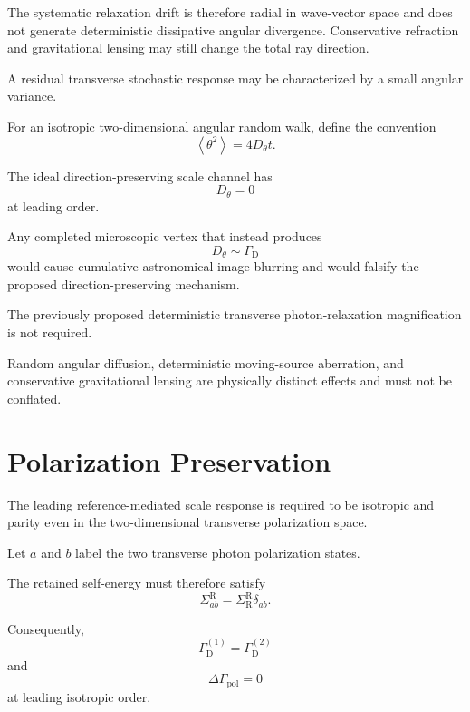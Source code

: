 The systematic relaxation drift is therefore radial in wave-vector space and
does not generate deterministic dissipative angular divergence. Conservative
refraction and gravitational lensing may still change the total ray direction.

A residual transverse stochastic response may be characterized by a small
angular variance.

For an isotropic two-dimensional angular random walk, define the convention
\begin{equation}
    \left\langle
        \theta^2
    \right\rangle
    =
    4D_\theta t.
    \label{eq:AR_Dtheta}
\end{equation}

The ideal direction-preserving scale channel has
\begin{equation}
    D_\theta=0
\end{equation}
at leading order.

Any completed microscopic vertex that instead produces
\begin{equation}
    D_\theta
    \sim
    \Gamma_{\mathrm D}
\end{equation}
would cause cumulative astronomical image blurring and would falsify the
proposed direction-preserving mechanism.

The previously proposed deterministic transverse photon-relaxation
magnification is not required.

Random angular diffusion, deterministic moving-source aberration, and
conservative gravitational lensing are physically distinct effects and must
not be conflated.


\section{Polarization Preservation}

The leading reference-mediated scale response is required to be isotropic and
parity even in the two-dimensional transverse polarization space.

Let \(a\) and \(b\) label the two transverse photon polarization states.

The retained self-energy must therefore satisfy
\begin{equation}
    \boxed{
    \Sigma_{ab}^{\mathrm R}
    =
    \Sigma_{\mathrm R}^{\mathrm R}
    \delta_{ab}.
    }
    \label{eq:AR_pol_identity}
\end{equation}

Consequently,
\begin{equation}
    \Gamma_{\mathrm D}^{(1)}
    =
    \Gamma_{\mathrm D}^{(2)}
\end{equation}
and
\begin{equation}
    \boxed{
    \Delta\Gamma_{\mathrm{pol}}
    =
    0
    }
    \label{eq:AR_pol_zero}
\end{equation}
at leading isotropic order.

